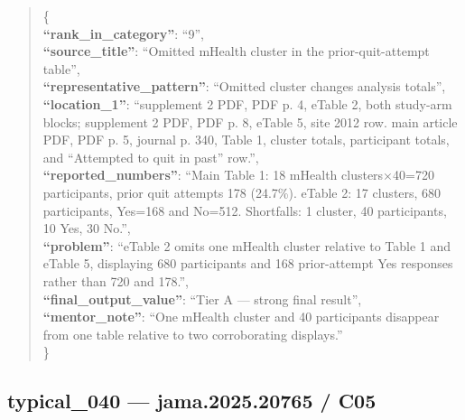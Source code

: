 \documentclass[
  letterpaper,
  9pt]{extreport}
\begin{document}
\begin{quote}
\{\\
\textbf{``rank\_in\_category''}: ``9'',\\
\textbf{``source\_title''}: ``Omitted mHealth cluster in the
prior-quit-attempt table'',\\
\textbf{``representative\_pattern''}: ``Omitted cluster changes analysis
totals'',\\
\textbf{``location\_1''}: ``supplement 2 PDF, PDF p. 4, eTable 2, both
study-arm blocks; supplement 2 PDF, PDF p. 8, eTable 5, site 2012 row.
main article PDF, PDF p. 5, journal p. 340, Table 1, cluster totals,
participant totals, and ``Attempted to quit in past'' row.'',\\
\textbf{``reported\_numbers''}: ``Main Table 1: 18 mHealth
clusters×40=720 participants, prior quit attempts 178 (24.7\%). eTable
2: 17 clusters, 680 participants, Yes=168 and No=512. Shortfalls: 1
cluster, 40 participants, 10 Yes, 30 No.'',\\
\textbf{``problem''}: ``eTable 2 omits one mHealth cluster relative to
Table 1 and eTable 5, displaying 680 participants and 168 prior-attempt
Yes responses rather than 720 and 178.'',\\
\textbf{``final\_output\_value''}: ``Tier A --- strong final result'',\\
\textbf{``mentor\_note''}: ``One mHealth cluster and 40 participants
disappear from one table relative to two corroborating displays.''\\
\}
\end{quote}

\hypertarget{typical_040--jama202520765--c05}{%
\subsection{typical\_040 --- jama.2025.20765 /
C05}\label{typical_040--jama202520765--c05}}
\end{document}

